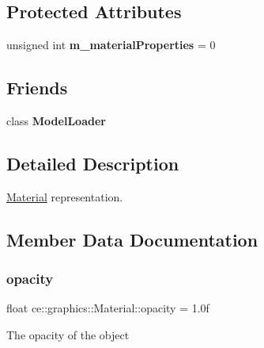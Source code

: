 \subsection*{Protected Attributes}
\begin{DoxyCompactItemize}
\item 
\mbox{\label{structce_1_1graphics_1_1_material_aff162e4070b34139c00cc149c70eb5f8}} 
unsigned int {\bfseries m\+\_\+material\+Properties} = 0
\end{DoxyCompactItemize}
\subsection*{Friends}
\begin{DoxyCompactItemize}
\item 
\mbox{\label{structce_1_1graphics_1_1_material_ac22dade55c1e8f81ea3e0892cd321190}} 
class {\bfseries Model\+Loader}
\end{DoxyCompactItemize}


\subsection{Detailed Description}
\hyperlink{structce_1_1graphics_1_1_material}{Material} representation. 

\subsection{Member Data Documentation}
\mbox{\label{structce_1_1graphics_1_1_material_ad6f3a5c250e374b47ca6bbefb75b8a6c}} 
\subsubsection{\texorpdfstring{opacity}{opacity}}
{\footnotesize\ttfamily float ce\+::graphics\+::\+Material\+::opacity = 1.\+0f}

The opacity of the object \mbox{\label{structce_1_1graphics_1_1_material_a583b33732dc9ed17a20d9d1bcd636a52}} 
